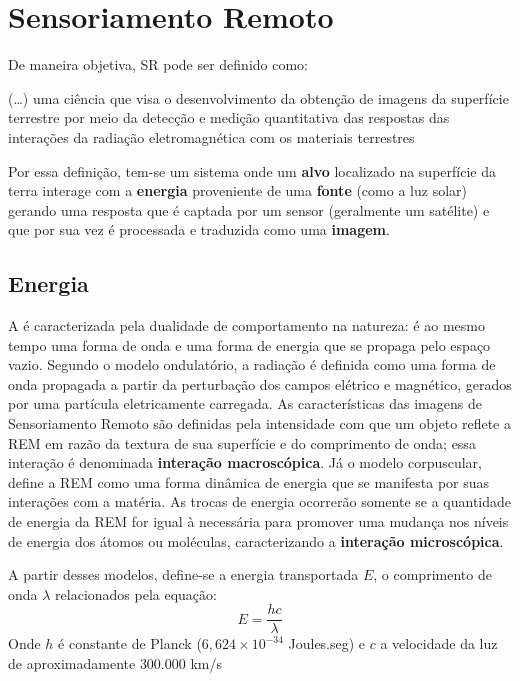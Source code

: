 \section{Sensoriamento Remoto}\label{sensoriamento-remoto}

De maneira objetiva, \acs{SR} pode ser definido como:

\begin{citacao}
(\ldots{}) uma ciência que visa o desenvolvimento da obtenção de
imagens da superfície terrestre por meio da detecção e medição
quantitativa das respostas das interações da radiação eletromagnética
com os materiais terrestres \cite[p. 3]{meneses2012introduccao}
\end{citacao}

Por essa definição, tem-se um sistema onde um \textbf{alvo} localizado
na superfície da terra interage com a \textbf{energia} proveniente de
uma \textbf{fonte} (como a luz solar) gerando uma resposta que é captada
por um sensor (geralmente um satélite) e que por sua vez é processada e
traduzida como uma \textbf{imagem}.

\subsection{Energia}\label{energia}

A  é caracterizada pela dualidade de
comportamento na natureza: é ao mesmo tempo uma forma de onda e uma
forma de energia que se propaga pelo espaço vazio. Segundo o modelo
ondulatório, a radiação é definida como uma forma de onda propagada a
partir da perturbação dos campos elétrico e magnético, gerados por uma
partícula eletricamente carregada. As características das imagens de Sensoriamento Remoto
são definidas pela intensidade com que um objeto reflete a \acs{REM} em razão
da textura de sua superfície e do comprimento de onda; essa interação é
denominada \textbf{interação macroscópica}. Já o modelo corpuscular,
define a \acs{REM} como uma forma dinâmica de energia que se manifesta por
suas interações com a matéria. As trocas de energia ocorrerão somente se
a quantidade de energia da \acs{REM} for igual à necessária para promover uma
mudança nos níveis de energia dos átomos ou moléculas, caracterizando a
\textbf{interação microscópica}. \cite{meneses2012introduccao}

A partir desses modelos, define-se a energia transportada $E$, o
comprimento de onda $\lambda$ relacionados pela equação: 
\begin{equation}
E = \frac{hc}{\lambda}
\end{equation}Onde $h$ é constante de Planck ($6,624\times10^{-34}$ Joules.seg) e
$c$ a velocidade da luz de aproximadamente $300.000$ km/s

